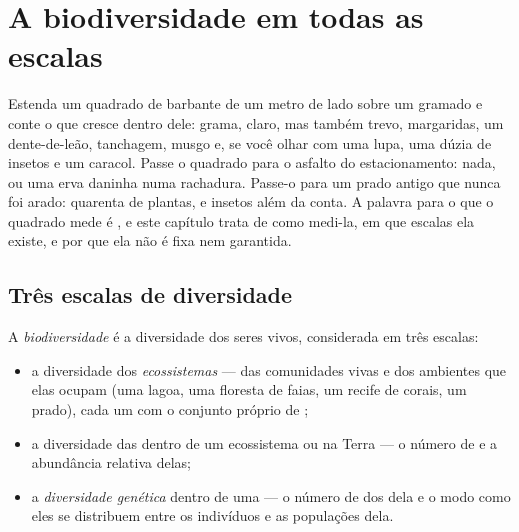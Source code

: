 \chapter{A biodiversidade em todas as escalas}\label{ch:g10:biodiversity-scales}

Estenda um quadrado de barbante de um metro de lado sobre um gramado e
conte o que cresce dentro dele: grama, claro, mas também trevo,
margaridas, um dente-de-leão, tanchagem, musgo e, se você olhar com uma
lupa, uma dúzia de insetos e um caracol. Passe o quadrado para o
asfalto do estacionamento: nada, ou uma erva daninha numa rachadura.
Passe-o para um prado antigo que nunca foi arado: quarenta  de
plantas, e insetos além da conta. A palavra para o que o quadrado mede
é \emph{}, e este capítulo trata de como medi-la, em que
escalas ela existe, e por que ela não é fixa nem garantida.

\section{Três escalas de diversidade}

\begin{definition}[Biodiversidade]\label{def:g10:biodiversity-scales:biodiversity}
A \emph{biodiversidade} é a diversidade dos seres
vivos, considerada em três escalas:
\begin{itemize}
  \item a diversidade dos \emph{ecossistemas} ---
        das comunidades vivas e dos ambientes que elas ocupam (uma
        lagoa, uma floresta de faias, um recife de corais, um prado),
        cada um com o conjunto próprio de ;
  \item a diversidade das  dentro de um
        ecossistema ou na Terra --- o número de  e a abundância
        relativa delas;
  \item a \emph{diversidade genética}
        dentro de uma  --- o número de  dos  dela e o
        modo como eles se distribuem entre os indivíduos e as
        populações dela.
\end{itemize}
\end{definition}

